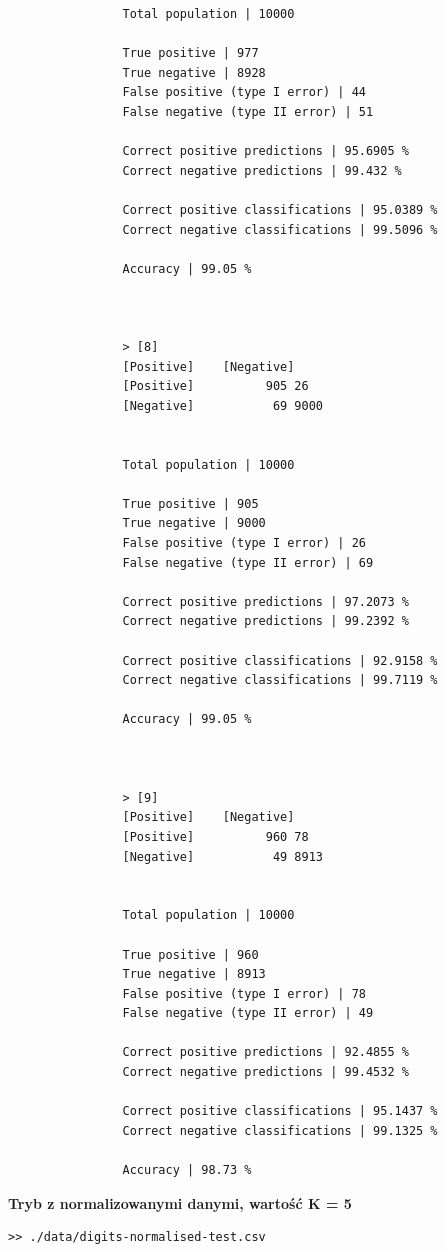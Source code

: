 \documentclass{classrep}
\begin{document}
{{{\begin{lstlisting}
                Total population | 10000

                True positive | 977
                True negative | 8928
                False positive (type I error) | 44
                False negative (type II error) | 51

                Correct positive predictions | 95.6905 %
                Correct negative predictions | 99.432 %

                Correct positive classifications | 95.0389 %
                Correct negative classifications | 99.5096 %

                Accuracy | 99.05 %



                > [8]
                [Positive]    [Negative]
                [Positive]          905 26
                [Negative]           69 9000


                Total population | 10000

                True positive | 905
                True negative | 9000
                False positive (type I error) | 26
                False negative (type II error) | 69

                Correct positive predictions | 97.2073 %
                Correct negative predictions | 99.2392 %

                Correct positive classifications | 92.9158 %
                Correct negative classifications | 99.7119 %

                Accuracy | 99.05 %



                > [9]
                [Positive]    [Negative]
                [Positive]          960 78
                [Negative]           49 8913


                Total population | 10000

                True positive | 960
                True negative | 8913
                False positive (type I error) | 78
                False negative (type II error) | 49

                Correct positive predictions | 92.4855 %
                Correct negative predictions | 99.4532 %

                Correct positive classifications | 95.1437 %
                Correct negative classifications | 99.1325 %

                Accuracy | 98.73 %

                \end{lstlisting}
                \textbf{Tryb z normalizowanymi danymi, wartość K = 5}
                \begin{lstlisting}
>> ./data/digits-normalised-test.csv


\end{lstlisting}}}}
\end{document}
